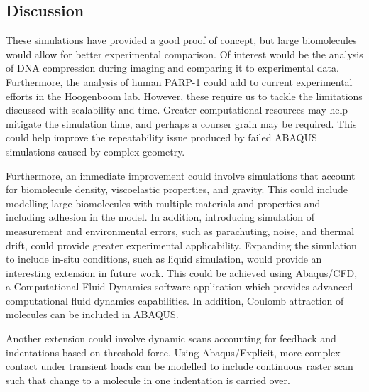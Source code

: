 \subsection{Discussion}

These simulations have provided a good proof of concept, but large biomolecules would allow for better experimental comparison. Of interest would be the analysis of DNA compression during imaging and comparing it to experimental data. Furthermore, the analysis of human PARP-1 could add to current experimental efforts in the Hoogenboom lab. However, these require us to tackle the limitations discussed with scalability and time. Greater computational resources may help mitigate the simulation time, and perhaps a courser grain may be required. This could help improve the repeatability issue produced by failed ABAQUS simulations caused by complex geometry.

Furthermore, an immediate improvement could involve simulations that account for biomolecule density, viscoelastic properties, and gravity. This could include modelling large biomolecules with multiple materials and properties and including adhesion in the model. In addition, introducing simulation of measurement and environmental errors, such as parachuting, noise, and thermal drift, could provide greater experimental applicability. Expanding the simulation to include in-situ conditions, such as liquid simulation, would provide an interesting extension in future work. This could be achieved using Abaqus/CFD, a Computational Fluid Dynamics software application which provides advanced computational fluid dynamics capabilities. In addition, Coulomb attraction of molecules can be included in ABAQUS. 

Another extension could involve dynamic scans accounting for feedback and indentations based on threshold force. Using Abaqus/Explicit, more complex contact under transient loads can be modelled to include continuous raster scan such that change to a molecule in one indentation is carried over. 


